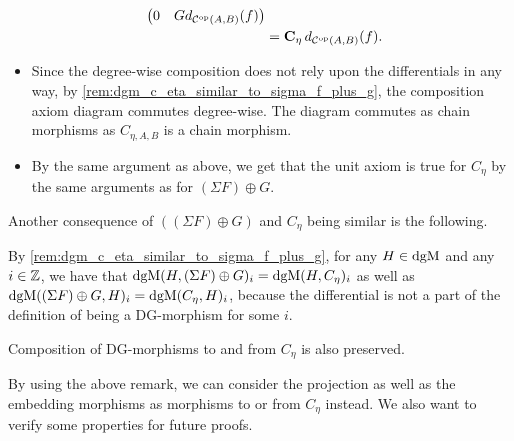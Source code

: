 \begin{remark}
\begin{itemize}
{\begin{align*}
\begin{pmatrix}
                    0 & G d_{{\mathcal{C}}^{\operatorname{op}}(A, B)}(f)
                \end{pmatrix} \\
                &= \operatorname{\mathbf{C}}_{\eta} d_{{\mathcal{C}}^{\operatorname{op}}(A, B)}(f).
            \end{align*}
        }
        \item {
            Since the degree-wise composition does not rely upon the differentials in any way, by \autoref{rem:dgm_c_eta_similar_to_sigma_f_plus_g},
            the composition axiom diagram commutes degree-wise. The diagram commutes as chain morphisms as \( C_{\eta, A, B} \) is a chain morphism.
        }
        \item {
            By the same argument as above, we get that the unit axiom is true for \( C_{\eta} \) by the same arguments as for \( (\Sigma F) \oplus G \).
        }
    \end{itemize}
\end{remark}

Another consequence of \( ((\Sigma F) \oplus G) \) and \( C_{\eta} \) being similar is the following.

\begin{remark}
    \label{rem:dgm_different_dg_morphisms_same_space_give_degree-wise_same_morphisms}
    By \autoref{rem:dgm_c_eta_similar_to_sigma_f_plus_g}, for any \( H \in \operatorname{dgM} \) and any \( i \in {\mathbb{Z}} \), we have that \( \operatorname{dgM}(H, (\Sigma F) \oplus G)_i = \operatorname{dgM}(H, C_{\eta})_i \) as well as \( \operatorname{dgM}((\Sigma F) \oplus G, H)_i = \operatorname{dgM}(C_{\eta}, H)_i \), because the differential is not a part of the definition of being a DG-morphism for some \( i \).

    Composition of DG-morphisms to and from \( C_{\eta} \) is also preserved.
\end{remark}

By using the above remark, we can consider the projection as well as the embedding morphisms as morphisms to or from \( C_{\eta} \) instead. We also want to verify some properties for future proofs.

